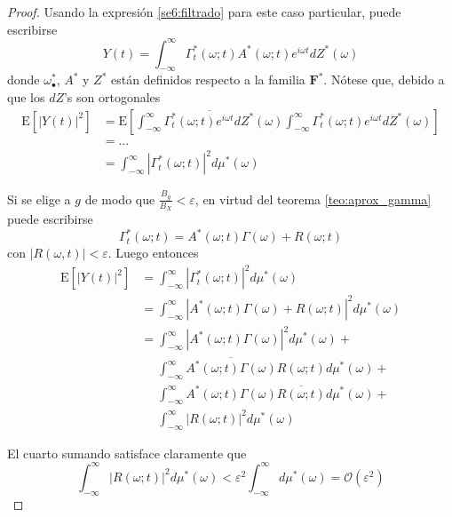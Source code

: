\documentclass[12pt,letterpaper,draft]{book}
\newcommand{\intR}{\int_{-\infty}^{\infty}}
\newcommand{\ef}{\mathbf{F}}
\newcommand{\efstar}{\ef^{\boldsymbol{*}}}
\newcommand{\E}[1]{\mathrm{E}\left[ #1 \right]}
\newcommand{\abso}[1]{\left| #1 \right|}
\newcommand{\orden}[1]{\mathcal{O}\left( #1 \right)}
\newcommand{\pheq}{\phantom{=}}
\begin{document}
\begin{proof}
Usando la expresión \ref{se6:filtrado} para este caso particular, puede escribirse
\begin{equation}
Y(t) = \intR \Gamma_t^{*} (\omega; t) A^{*}(\omega; t) e^{i \omega t} dZ^{*}(\omega)
\end{equation}
donde $\omega_\bullet^{*}$, $A^{*}$ y $Z^{*}$ están definidos respecto a la familia $\efstar$.
Nótese que, debido a que los $dZ$'s son ortogonales
\begin{align*}
\E{\abso{Y(t)}^{2}} 
&= 
\E{
\overline{\intR \Gamma_t^{*} (\omega; t) e^{i \omega t} dZ^{*}(\omega)}
\intR \Gamma_t^{*} (\omega; t) e^{i \omega t} dZ^{*}(\omega) }\\
&= ... \\
&= \intR \abso{\Gamma_t^{*} (\omega; t)}^{2} d\mu^{*}(\omega)
\end{align*}

Si se elige a $g$ de modo que $\frac{B_g}{B_X} < \varepsilon$, en virtud del teorema \ref{teo:aprox_gamma} puede escribirse
\begin{equation}
\Gamma_t^{*}(\omega; t) = A^{*}(\omega; t) \Gamma(\omega) + R(\omega; t)
\end{equation}
con $\abso{R(\omega,t)} < \varepsilon$. Luego entonces
\begin{align*}
\E{\abso{Y(t)}^{2}} 
&= 
\intR \abso{\Gamma_t^{*} (\omega; t)}^{2} d\mu^{*}(\omega) \\
&= 
\intR \abso{A^{*}(\omega; t) \Gamma(\omega) + R(\omega; t)}^{2} d\mu^{*}(\omega) \\
&= 
\intR \abso{A^{*}(\omega; t) \Gamma(\omega)}^{2} d\mu^{*}(\omega) +\\
&\pheq
\intR \overline{A^{*}(\omega; t) \Gamma(\omega)} R(\omega; t) d\mu^{*}(\omega) +\\
&\pheq
\intR A^{*}(\omega; t) \Gamma(\omega) \overline{ R(\omega; t)} d\mu^{*}(\omega) +\\
&\pheq
\intR \abso{R(\omega; t)}^{2} d\mu^{*}(\omega) 
\end{align*}

El cuarto sumando satisface claramente que
\begin{equation}
\intR \abso{R(\omega; t)}^{2} d\mu^{*}(\omega)  < \varepsilon^{2} \intR d\mu^{*}(\omega) 
= \orden{\varepsilon^{2}}
\end{equation}


\end{proof}
\end{document}

